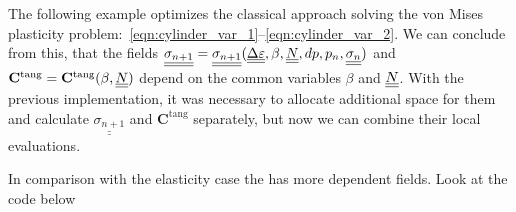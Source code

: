 \documentclass[12pt]{article}
\newcommand{\todolink}{\todo[fancyline, size=\scriptsize]{TOCITE}}
\begin{document}
The following example optimizes the classical approach solving the von Mises plasticity problem:~\eqref{eqn:cylinder_var_1}--\eqref{eqn:cylinder_var_2}.
We can conclude from this, that the fields $\underline{\underline{\sigma_{n+1}}} = \underline{\underline{\sigma_{n+1}}}(\underline{\underline{\Delta\varepsilon}}, \beta, \underline{\underline{N}}, dp, p_n, \underline{\underline{\sigma_n}})$ and $\mathbf{C}^\text{tang} = \mathbf{C}^\text{tang}(\beta, \underline{\underline{N}})$ depend on the common variables $\beta$ and $\underline{\underline{N}}$. With the previous implementation, it was necessary to allocate additional space for them and calculate $\underline{\underline{\sigma_{n+1}}}$ and $\mathbf{C}^\text{tang}$ separately, but now we can combine their local evaluations.

In comparison with the elasticity case the   has more dependent fields. Look at the code below
\end{document}
